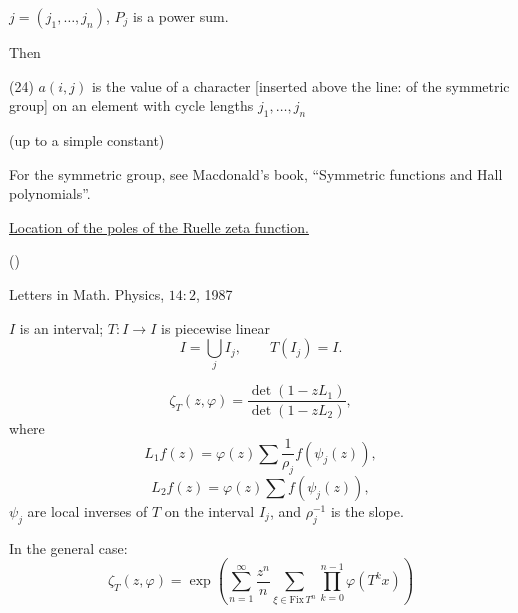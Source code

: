 $j=(j_1,\ldots,j_n)$, $P_j$ is a power sum.

Then

(24) $a(i,j)$ is the value of a character [inserted above the line: of the symmetric group]
on an element with cycle lengths $j_1,\ldots,j_n$

(up to a simple constant)

For the symmetric group, see Macdonald's book, “Symmetric functions
and Hall polynomials”.

\medskip
\underline{Location of the poles of the Ruelle zeta function.}

()

Letters in Math. Physics, $14:2$, 1987

$I$ is an interval; $T:I\to I$ is piecewise linear
\begin{equation*}
 I=\bigcup_j I_j,\qquad T(I_j)=I.
\end{equation*}



\begin{equation}
 \zeta_T(z,\varphi)=\frac{\det(1-zL_1)}{\det(1-zL_2)},
 \tag{1}
\end{equation}
where
\begin{equation*}
 L_1f(z)=\varphi(z)\sum\frac{1}{\rho_j}f(\psi_j(z)),
\end{equation*}
\begin{equation*}
 L_2f(z)=\varphi(z)\sum f(\psi_j(z)),
\end{equation*}
$\psi_j$ are local inverses of $T$ on the interval $I_j$, and $\rho_j^{-1}$ is the slope.

In the general case:
\begin{equation}
 \zeta_T(z,\varphi)=
 \exp\left(
 \sum_{n=1}^{\infty}\frac{z^n}{n}
 \sum_{\xi\in\mathrm{Fix}\,T^n}
 \prod_{k=0}^{n-1}\varphi(T^k x)
 \right)
 \tag{2}
\end{equation}



